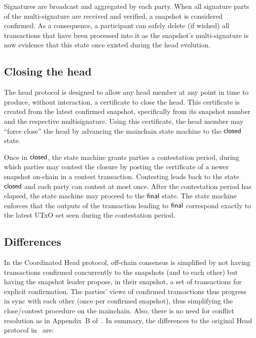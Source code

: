 Signatures are broadcast and aggregated by each party. When all signature parts
of the multi-signature are received and verified, a snapshot is considered
confirmed. As a consequence, a participant can safely delete (if wished) all
transactions that have been processed into it as the snapshot's multi-signature
is now evidence that this state once existed during the head evolution.


\subsection{Closing the head}

The head protocol is designed to allow any head member at any point in time to
produce, without interaction, a certificate to close the head. This certificate
is created from the latest confirmed snapshot, specifically from its snapshot
number and the respective multisignature. Using this certificate, the head
member may ``force close'' the head by advancing the mainchain state machine to
the $\mathsf{closed}$ state.

Once in $\mathsf{closed}$, the state machine grants parties a contestation period,
during which parties may contest the closure by posting the certificate of a
newer snapshot on-chain in a contest transaction. Contesting leads back to the state
$\mathsf{closed}$ and each party can contest at most once. After the contestation period has elapsed, the state machine may
proceed to the $\mathsf{final}$ state. The state machine enforces that the outputs of
the transaction leading to $\mathsf{final}$ correspond exactly to the latest UTxO set
seen during the contestation period.

\subsection{Differences}
In the Coordinated Head protocol, off-chain consensus is simplified by not
having transactions confirmed concurrently to the snapshots (and to each other)
but having the snapshot leader propose, in their snapshot, a set of transactions
for explicit confirmation. The parties' views of confirmed transactions thus
progress in sync with each other (once per confirmed snapshot), thus simplifying
the close/contest procedure on the mainchain. Also, there is no need for
conflict resolution as in Appendix~B of~\cite{hydrahead20}. In summary, the
differences to the original Head protocol in~\cite{hydrahead20} are:

